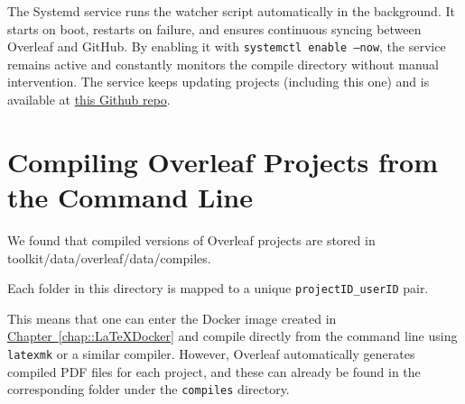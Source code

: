 The Systemd service runs the watcher script automatically in the background.
It starts on boot, restarts on failure, and ensures continuous syncing between
Overleaf and GitHub. By enabling it with \texttt{systemctl enable --now}, the
service remains active and constantly monitors the compile directory without
manual intervention. The service keeps updating projects (including this one) and is available at \href{https://github.com/IvanFarfan08/Overleaf_Files_SSW590F}{this Github repo}.

\section{Compiling Overleaf Projects from the Command Line}

We found that compiled versions of Overleaf projects are stored in 
toolkit/data/overleaf/data/compiles. 

Each folder in this directory is mapped to a unique \texttt{projectID\_userID} pair.

This means that one can enter the Docker image created in 
\hyperref[chap::LaTeXDocker]{Chapter~\ref*{chap::LaTeXDocker}} and compile directly from the 
command line using \texttt{latexmk} or a similar compiler.  
However, Overleaf automatically generates compiled PDF files for each project, 
and these can already be found in the corresponding folder under the 
\texttt{compiles} directory.
